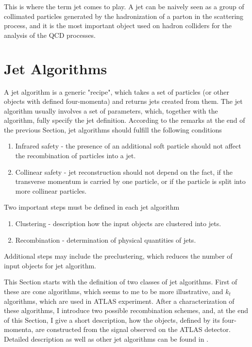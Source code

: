 This is where the term jet comes to play. A jet can be naively seen as a group
of collimated particles generated by the hadronization of a parton in the
scattering process, and it is the most important object used on hadron colliders
for the analysis of the QCD processes.

\section{Jet Algorithms}

A jet algorithm is a generic "recipe", which takes a set of particles (or other
objects with defined four-momenta) and returns jets created from them. The jet
algorithm usually involves a set of parameters, which, together with the
algorithm, fully specify the jet definition. According to the remarks at the end
of the previous Section, jet algorithms should fulfill the following conditions 

\begin{enumerate}
  \item Infrared safety - the presence of an additional soft particle should not
    affect the recombination of particles into a jet.
  \item Collinear safety - jet reconstruction should not depend on the fact, if
    the transverse momentum is carried by one particle, or if the particle is split
    into more collinear particles.
\end{enumerate}
Two important steps must be defined in each jet algorithm

\begin{enumerate}
  \item Clustering - description how the input objects are clustered into jets.
  \item Recombination - determination of physical quantities of jets.
\end{enumerate}
Additional steps may include the preclustering, which reduces the number of input
objects for jet algorithm.

This Section starts with the definition of two classes of jet algorithms.
First of these are cone algorithms, which seems to me to be more
illustrative, and $k_t$ algorithms, which are used in ATLAS experiment. After
a characterization of these algorithms, I introduce two possible recombination
schemes, and, at the end of this Section, I give a short description, how the
objects, defined by its four-momenta, are constructed from the signal
observed on the ATLAS detector. Detailed description as well as other jet
algorithms can be found in \cite{ATLASmain,JetDoporuceniZdenek}.

